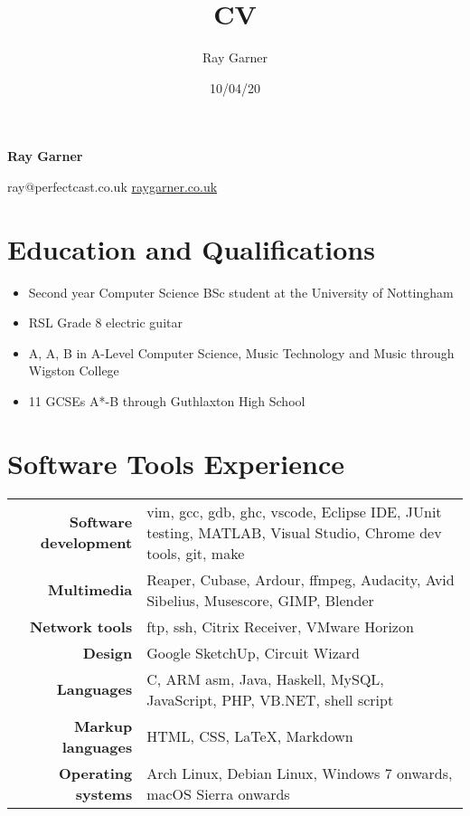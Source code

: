 \documentclass{article}
\title{CV}
\date{10/04/20}
\author{Ray Garner}
\makeatletter
\renewcommand{\maketitle}{
\vskip -5cm
\begin{center}


{\huge\bfseries
Ray Garner}

\vskip 0.25cm

{\large
ray@perfectcast.co.uk\hspace{0.5cm}
\href{https://www.raygarner.co.uk}{raygarner.co.uk}}

\vskip 1cm

\end{center}
}
\makeatother
\begin{document}
\maketitle

\section{Education and Qualifications}

\begin{itemize}[noitemsep]

\renewcommand{\labelitemi}{$\square$}
\item Second year Computer Science BSc student at the University of Nottingham
\item RSL Grade 8 electric guitar
\item A, A, B in A-Level Computer Science, Music Technology and Music through Wigston College
\item 11 GCSEs A*-B through Guthlaxton High School

\end{itemize}

\section{Software Tools Experience}

\renewcommand{\arraystretch}{1.4}

\begin{tabular}{ r | p{11cm} }

{\large\bfseries Software development} & {vim, gcc, gdb, ghc, vscode, Eclipse IDE, JUnit testing, MATLAB, Visual Studio, Chrome dev tools, git, make}\\
{\large\bfseries Multimedia} & {Reaper, Cubase, Ardour, ffmpeg, Audacity, Avid Sibelius, Musescore, GIMP, Blender} \\
{\large\bfseries Network tools} & {ftp, ssh, Citrix Receiver, VMware Horizon} \\
{\large\bfseries Design} & {Google SketchUp, Circuit Wizard} \\
{\large\bfseries Languages} & {C, ARM asm, Java, Haskell, MySQL, JavaScript, PHP, VB.NET, shell script}\\
{\large\bfseries Markup languages} & {HTML, CSS, \LaTeX, Markdown}\\
{\large\bfseries Operating systems} & {Arch Linux, Debian Linux, Windows 7 onwards, macOS Sierra onwards}\\
\end{tabular}
\end{document}
